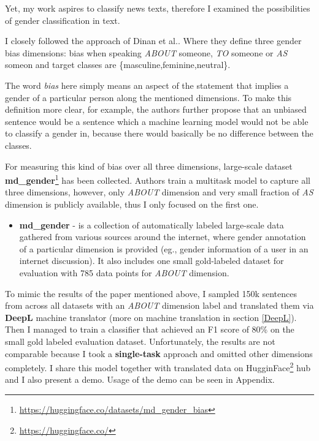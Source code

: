 Yet, my work aspires to classify news texts, therefore I examined the possibilities of gender classification in text.

I closely followed the approach of Dinan et al.\cite{dinan2020multi}. Where they define three gender bias dimensions: bias when speaking \textit{ABOUT} someone, \textit{TO} someone or \textit{AS} someon and target classes are \{masculine,feminine,neutral\}. 

The word \textit{bias} here simply means an aspect of the statement that implies a gender of a particular person along the mentioned dimensions. To make this definition more clear, for example, the authors further propose that an unbiased sentence would be a sentence which a machine learning model would not be able to classify a gender in, because there would basically be no difference between the classes.

For measuring this kind of bias over all three dimensions, large-scale dataset \textbf{md\_gender}\footnote{\url{https://huggingface.co/datasets/md_gender_bias}} has been collected. Authors train a multitask model to capture all three dimensions, however, only \textit{ABOUT} dimension and very small fraction of \textit{AS} dimension is publicly available, thus I only focused on the first one.

\begin{itemize}
\item \textbf{md\_gender} - is a collection of automatically labeled large-scale data gathered from various sources around the internet, where gender annotation of a particular dimension is provided (eg., gender information of a user in an internet discussion). It also includes one small gold-labeled dataset for evaluation with 785 data points for \textit{ABOUT} dimension.
\end{itemize}

To mimic the results of the paper mentioned above, I sampled 150k sentences from across all datasets with an \textit{ABOUT} dimension label and translated them via \textbf{DeepL} machine translator (more on machine translation in section \ref{DeepL}). Then I managed to train a classifier that achieved an F1 score of 80\% on the small gold labeled evaluation dataset. Unfortunately, the results are not comparable because I took a \textbf{single-task} approach and omitted other dimensions completely. I share this model together with translated data on HugginFace\footnote{\url{https://huggingface.co/}} hub and I also present a demo. Usage of the demo can be seen in Appendix.

